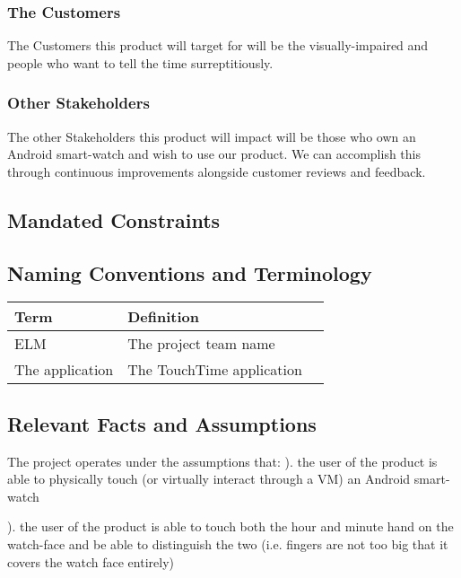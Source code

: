 \documentclass[12pt, titlepage]{article}
\begin{document}
\subsubsection{The Customers}

The Customers this product will target for will be the visually-impaired and people who want to tell the time surreptitiously.

\subsubsection{Other Stakeholders}

The other Stakeholders this product will impact will be those who own an Android smart-watch and wish to use our product. We can accomplish this through continuous improvements alongside customer reviews and feedback. 

\subsection{Mandated Constraints}
\subsection{Naming Conventions and Terminology}

\begin{center}
    \begin{tabular}{| l | l | p{5cm} | }
    \hline
    Term & Definition \\ \hline
    ELM & The project team name \\ \hline
    The application & The TouchTime application \\ \hline
    \end{tabular}
\end{center}

\subsection{Relevant Facts and Assumptions}
The project operates under the assumptions that:
\vspace{2mm}
). the user of the product is able to physically touch (or virtually interact through a VM) an Android smart-watch

). the user of the product is able to touch both the hour and minute hand on the watch-face and be able to distinguish the two (i.e. fingers are not too big that it covers the watch face entirely)
\end{document}
